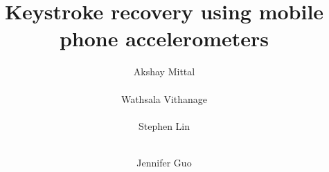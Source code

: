 \documentclass{acm_proc_article-sp}
\begin{document}
\title{Keystroke recovery using mobile phone accelerometers}

%
%
%
%
%

%
\author{
%
%
\alignauthor
Akshay Mittal\\
       \\
\alignauthor Wathsala Vithanage\\
       \\
\alignauthor Stephen Lin\\
       \\
\and  %
\alignauthor Jennifer Guo\\
       \\
}
\end{document}
